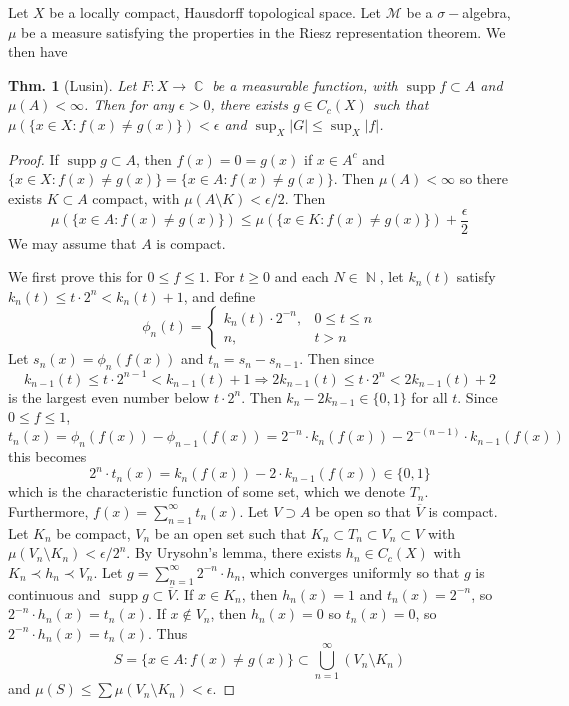 \documentclass[12pt, a4paper]{book}
\DeclareMathOperator{\N}{\mathbb{N}}
\DeclareMathOperator{\C}{\mathbb{C}}
\DeclareMathOperator{\supp}{supp}
\newtheorem{theorem}{Thm.}[section]
\theoremstyle{nonumberplain}
\newtheorem{proof}{Proof}
\begin{document}
Let $X$ be a locally compact, Hausdorff topological space.
Let $\mathcal{M}$ be a $\sigma-$algebra, $\mu$ be a measure satisfying the properties in the Riesz representation theorem.
We then have
\begin{theorem}[Lusin]
    Let $F:X\to\C$ be a measurable function, with $\supp f\subset A$ and $\mu(A)<\infty$.
    Then for any $\epsilon>0$, there exists $g\in C_c(X)$ such that $\mu(\{x\in X:f(x)\neq g(x)\})<\epsilon$ and $\sup_X|G|\leq\sup_X|f|$.
\end{theorem}
\begin{proof}
    If $\supp g\subset A$, then $f(x)=0=g(x)$ if $x\in A^c$ and $\{x\in X:f(x)\neq g(x)\}=\{x\in A:f(x)\neq g(x)\}$.
    Then $\mu(A)<\infty$ so there exists $K\subset A$ compact, with $\mu(A\setminus K)<\epsilon/2$.
    Then
    \[\mu\left(\{x\in A:f(x)\neq g(x)\}\right)\leq\mu\left(\{x\in K:f(x)\neq g(x)\}\right)+\frac{\epsilon}{2}\]
    We may assume that $A$ is compact.

    We first prove this for $0\leq f\leq 1$.
    For $t\geq 0$ and each $N\in\N$, let $k_n(t)$ satisfy $k_n(t)\leq t\cdot 2^n<k_n(t)+1$, and define
    \[\phi_n(t)=
        \begin{cases}
            k_n(t)\cdot 2^{-n},&0\leq t\leq n\\
            n,&t >n
        \end{cases}
    \]
    Let $s_n(x)=\phi_n(f(x))$ and $t_n=s_n-s_{n-1}$.
    Then since
    \[k_{n-1}(t)\leq t\cdot 2^{n-1}<k_{n-1}(t)+1\Longrightarrow 2k_{n-1}(t)\leq t\cdot 2^n<2k_{n-1}(t)+2\]
    is the largest even number below $t\cdot 2^n$.
    Then $k_n-2k_{n-1}\in\{0,1\}$ for all $t$.
    Since $0\leq f\leq 1$,
    \[t_n(x)=\phi_n(f(x))-\phi_{n-1}(f(x))=2^{-n}\cdot k_n(f(x))-2^{-(n-1)}\cdot k_{n-1}(f(x))\]
    this becomes
    \[2^n\cdot t_n(x)=k_n(f(x))-2\cdot k_{n-1}(f(x))\in\{0,1\}\]
    which is the characteristic function of some set, which we denote $T_n$.
    Furthermore, $f(x)=\sum\limits_{n=1}^\infty t_n(x)$.
    Let $V\supset A$ be open so that $\overline{V}$ is compact.
    Let $K_n$ be compact, $V_n$ be an open set such that $K_n\subset T_n\subset V_n\subset V$ with $\mu(V_n\setminus K_n)<\epsilon/2^n$.
    By Urysohn's lemma, there exists $h_n\in C_c(X)$ with $K_n\prec h_n\prec V_n$.
    Let $g=\sum\limits_{n=1}^\infty 2^{-n}\cdot h_n$, which converges uniformly so that $g$ is continuous and $\supp g\subset\overline{V}$.
    If $x\in K_n$, then $h_n(x)=1$ and $t_n(x)=2^{-n}$, so $2^{-n}\cdot h_n(x)=t_n(x)$.
    If $x\notin V_n$, then $h_n(x)=0$ so $t_n(x)=0$, so $2^{-n}\cdot h_n(x)=t_n(x)$.
    Thus
    \[S=\{x\in A:f(x)\neq g(x)\}\subset\bigcup\limits_{n=1}^\infty\left(V_n\setminus K_n\right)\]
    and $\mu(S)\leq\sum \mu(V_n\setminus K_n)<\epsilon$.


\end{proof}
\end{document}
